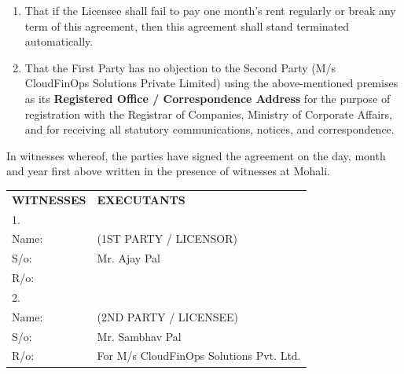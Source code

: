 \documentclass[a4paper,12pt]{article}
\begin{document}
\begin{enumerate}[itemsep=4mm]
\item That if the Licensee shall fail to pay one month's rent regularly or break any term of this agreement, then this agreement shall stand terminated automatically.

\item That the First Party has no objection to the Second Party (M/s CloudFinOps Solutions Private Limited) using the above-mentioned premises as its \textbf{Registered Office / Correspondence Address} for the purpose of registration with the Registrar of Companies, Ministry of Corporate Affairs, and for receiving all statutory communications, notices, and correspondence.

\end{enumerate}

\vspace{1cm}

\noindent In witnesses whereof, the parties have signed the agreement on the day, month and year first above written in the presence of witnesses at Mohali.

\vspace{1.5cm}

\noindent\begin{tabular}{p{6cm}p{6cm}}
\textbf{WITNESSES} & \textbf{EXECUTANTS} \\[1.5cm]
1. \underline{\hspace{4.5cm}} & \underline{\hspace{4.5cm}} \\
Name: & (1ST PARTY / LICENSOR) \\
S/o: & Mr. Ajay Pal \\
R/o: & \\[1.5cm]
2. \underline{\hspace{4.5cm}} & \underline{\hspace{4.5cm}} \\
Name: & (2ND PARTY / LICENSEE) \\
S/o: & Mr. Sambhav Pal \\
R/o: & For M/s CloudFinOps Solutions Pvt. Ltd. \\
\end{tabular}
\end{document}
